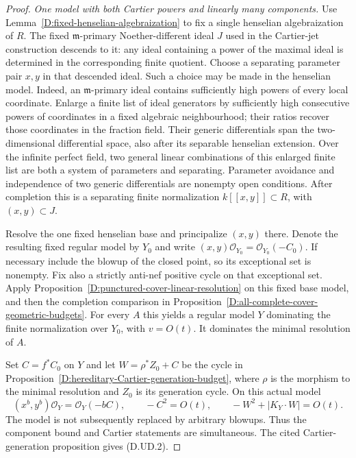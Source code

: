 \begin{proof}
\emph{One model with both Cartier powers and linearly many components.}
Use Lemma~\ref{D:fixed-henselian-algebraization} to fix a single
henselian algebraization of $R$. The fixed $\mathfrak m$-primary
Noether-different ideal $J$ used in the Cartier-jet construction
descends to it: any ideal containing a power of the maximal
ideal is determined in the corresponding finite quotient.
Choose a separating parameter pair $x,y$ in that descended
ideal. Such a choice may be made in the henselian model.
Indeed, an $\mathfrak m$-primary ideal contains sufficiently high
powers of every local coordinate. Enlarge a finite list of
ideal generators by sufficiently high consecutive powers of
coordinates in a fixed algebraic neighbourhood; their ratios
recover those coordinates in the fraction field. Their generic
differentials span the two-dimensional differential space,
also after its separable henselian extension. Over the infinite
perfect field, two general linear combinations of this enlarged
finite list are both a system of parameters and separating.
Parameter avoidance and independence
of two generic differentials are nonempty open conditions.
After completion this is a separating finite normalization
$k[[x,y]]\subset R$, with $(x,y)\subset J$.

Resolve the one fixed henselian base and principalize $(x,y)$
there. Denote the resulting fixed regular model by $Y_0$ and
write $(x,y)\mathcal O_{Y_0}=\mathcal O_{Y_0}(-C_0)$.
If necessary include the blowup of the closed point, so its
exceptional set is nonempty. Fix also a strictly anti-nef positive
cycle on that exceptional set. Apply
Proposition~\ref{D:punctured-cover-linear-resolution} on this
fixed base model, and then the completion comparison in
Proposition~\ref{D:all-complete-cover-geometric-budgets}.
For every $A$ this yields a regular model $Y$ dominating the
finite normalization over $Y_0$, with $v=O(t)$. It dominates
the minimal resolution of $A$.

Set $C=f^*C_0$ on $Y$ and let
$W=\rho^*Z_0+C$ be the cycle in
Proposition~\ref{D:hereditary-Cartier-generation-budget},
where $\rho$ is the morphism to the minimal resolution and
$Z_0$ is its generation cycle. On this actual model
\[
 (x^b,y^b)\mathcal O_Y=\mathcal O_Y(-bC),\qquad
 -C^2=O(t),\qquad -W^2+|K_Y\cdot W|=O(t).             \tag{D.UD.4}
\]
The model is not subsequently replaced by arbitrary blowups.
Thus the component bound and Cartier statements are simultaneous.
The cited Cartier-generation proposition gives (D.UD.2).


\end{proof}
